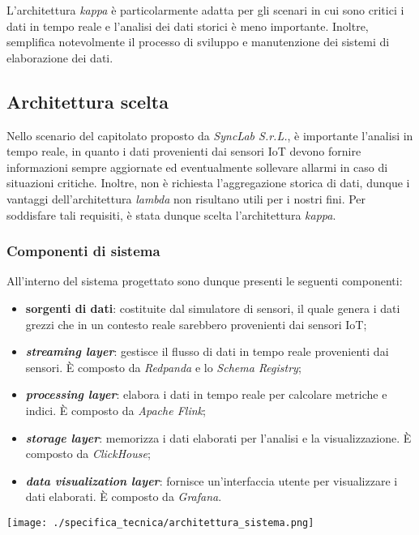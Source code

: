 L'architettura \textit{kappa} è particolarmente adatta per gli scenari in cui sono critici i dati in tempo reale e l'analisi dei dati storici è meno importante. Inoltre, semplifica notevolmente il processo di sviluppo e manutenzione dei sistemi di elaborazione dei dati.

\subsection{Architettura scelta}
Nello scenario del capitolato proposto da \textit{SyncLab S.r.L.}, è importante l'analisi in tempo reale, in quanto i dati provenienti dai sensori IoT devono fornire informazioni sempre aggiornate ed eventualmente
sollevare allarmi in caso di situazioni critiche. Inoltre, non è richiesta l'aggregazione storica di dati, dunque i vantaggi dell'architettura \textit{lambda} non risultano utili per i nostri fini.
Per soddisfare tali requisiti, è stata dunque scelta l'architettura \textit{kappa}.

\subsubsection{Componenti di sistema}
All'interno del sistema progettato sono dunque presenti le seguenti componenti:
\begin{itemize}
	\item \textbf{sorgenti di dati}: costituite dal simulatore di sensori, il quale genera i dati grezzi che in un contesto reale sarebbero provenienti dai sensori IoT;
	\item \textbf{\textit{streaming layer}}: gestisce il flusso di dati in tempo reale provenienti dai sensori. È composto da \textit{Redpanda} e lo \textit{Schema Registry};
	\item \textbf{\textit{processing layer}}: elabora i dati in tempo reale per calcolare metriche e indici. È composto da \textit{Apache Flink};
	\item \textbf{\textit{storage layer}}: memorizza i dati elaborati per l'analisi e la visualizzazione. È composto da \textit{ClickHouse};
	\item \textbf{\textit{data visualization layer}}: fornisce un'interfaccia utente per visualizzare i dati elaborati. È composto da \textit{Grafana}.
\end{itemize}

\begin{center}
	\texttt{[image: ./specifica\_tecnica/architettura\_sistema.png]}
\end{center}

